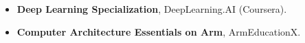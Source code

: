 \begin{itemize}
    \item \textbf{Deep Learning Specialization}, DeepLearning.AI (Coursera).
    \item \textbf{Computer Architecture Essentials on Arm}, ArmEducationX.
\end{itemize}
